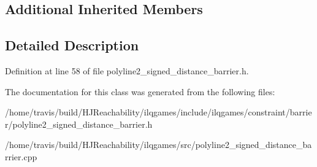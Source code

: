 \subsection*{Additional Inherited Members}


\subsection{Detailed Description}


Definition at line 58 of file polyline2\+\_\+signed\+\_\+distance\+\_\+barrier.\+h.



The documentation for this class was generated from the following files\+:\begin{DoxyCompactItemize}
\item 
/home/travis/build/\+H\+J\+Reachability/ilqgames/include/ilqgames/constraint/barrier/polyline2\+\_\+signed\+\_\+distance\+\_\+barrier.\+h\item 
/home/travis/build/\+H\+J\+Reachability/ilqgames/src/polyline2\+\_\+signed\+\_\+distance\+\_\+barrier.\+cpp\end{DoxyCompactItemize}
